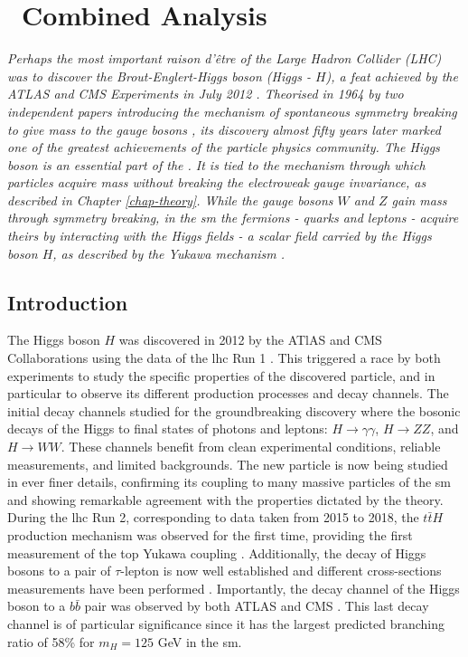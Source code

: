 \chapter[\vhbc\ Combined Analysis]{\vhbc\ Combined Analysis}\label{chap-VH}
\ChapFrame

\textit{Perhaps the most important \textit{raison d'être} of the \textit{Large Hadron Collider} (LHC) was to discover the Brout-Englert-Higgs boson (Higgs - $H$), a feat achieved by the ATLAS and CMS Experiments in July 2012 \cite{ATLAS:2012yve, CMS:2012qbp}. Theorised in 1964 by two independent papers introducing the mechanism of spontaneous symmetry breaking to give mass to the gauge bosons \cite{Englert:1964et,  PhysRevLett.13.508}, its discovery almost fifty years later marked one of the greatest achievements of the particle physics community. The Higgs boson is an essential part of the . It is tied to the mechanism through which particles acquire mass without breaking the electroweak gauge invariance, as described in Chapter \ref{chap-theory}. While the gauge bosons $W$ and $Z$ gain mass through symmetry breaking, in the \gls{sm} the fermions - quarks and leptons - acquire theirs by interacting with the Higgs fields - a scalar field carried by the Higgs boson $H$, as described by the Yukawa mechanism \cite{10.1143/PTPS.1.1}.}\\

\section{Introduction}
The Higgs boson $H$ \cite{Englert:1964et, PhysRevLett.13.508, Higgs:1964ia, PhysRevLett.13.585} was discovered in 2012 by the ATlAS and CMS Collaborations using the  data of the \gls{lhc} Run 1 \cite{ATLAS:2012yve, CMS:2012qbp}. This triggered a race by both experiments to study the specific properties of the discovered particle, and in particular to observe its different production processes and decay channels. The initial decay channels studied for the groundbreaking discovery where the bosonic decays of the Higgs to final states of photons and leptons: $H \rightarrow \gamma\gamma$, $H \rightarrow ZZ$, and $H \rightarrow WW$. These channels benefit from clean experimental conditions, reliable measurements, and limited backgrounds. The new particle is now being studied in ever finer details, confirming its coupling to many massive particles of the \gls{sm} and showing remarkable agreement with the properties dictated by the theory. During the \gls{lhc} Run 2, corresponding to data taken from 2015 to 2018, the $t\bar{t}H$ production mechanism was observed for the first time, providing the first measurement of the top Yukawa coupling \cite{ATLAS:2018mme, CMS:2018uxb}. Additionally, the decay of Higgs bosons to a pair of $\tau$-lepton is now well established and different cross-sections measurements have been performed \cite{atlasTauMeasu, CMS:2021gxc}. Importantly, the decay channel of the Higgs boson to a $b\bar{b}$ pair was observed by both ATLAS and CMS \cite{ATLAS:2018kot, CMS:2018nsn}. This last decay channel is of particular significance since it has the largest predicted branching ratio of 58\% for $m_H = 125$ GeV in the \gls{sm}. \\ 

